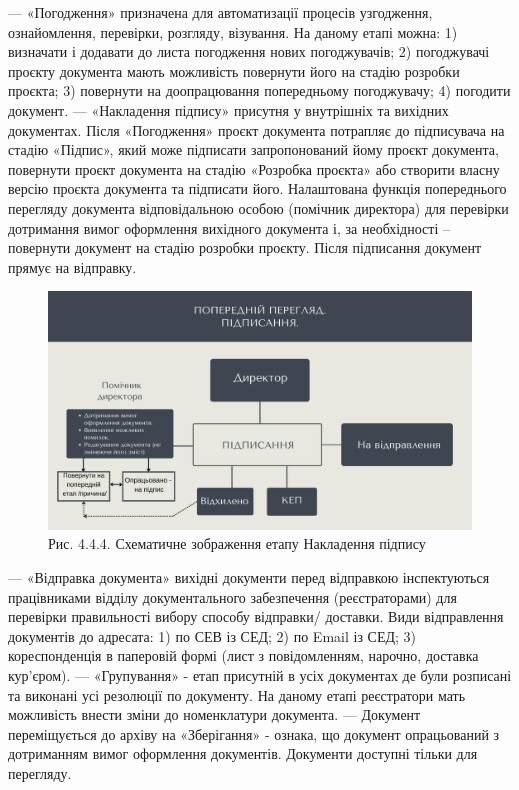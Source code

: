 --- «Погодження» призначена для автоматизації процесів узгодження,
ознайомлення, перевірки, розгляду, візування. На даному етапі можна:
1) визначати і додавати до листа погодження нових погоджувачів;
2) погоджувачі проєкту документа мають можливість повернути його
на стадію розробки проєкта;
3) повернути на доопрацювання попередньому погоджувачу;
4) погодити документ.
--- «Накладення підпису» присутня у внутрішніх та вихідних документах. Після
«Погодження» проєкт документа потрапляє до підписувача на стадію
«Підпис», який може підписати запропонований йому проєкт документа,
повернути проєкт документа на стадію «Розробка проєкта» або створити
власну версію проєкта документа та підписати його. Налаштована функція
попереднього перегляду документа відповідальною особою (помічник
директора) для перевірки дотримання вимог оформлення вихідного
документа і, за необхідності – повернути документ на стадію розробки
проєкту. Після підписання документ прямує на відправку.

\begin{figure}[!htbp]
\centerline{\includegraphics[width=\textwidth]{img/4.4.4.png}}
\caption{Рис. 4.4.4. Схематичне зображення етапу Накладення підпису}
\end{figure}

--- «Відправка документа» вихідні документи перед відправкою інспектуються
працівниками відділу документального забезпечення (реєстраторами) для
перевірки правильності вибору способу відправки/ доставки. Види
відправлення документів до адресата:
1) по СЕВ із СЕД;
2) по Email із СЕД;
3) кореспонденція в паперовій формі (лист з повідомленням, нарочно,
доставка кур’єром).
--- «Групування» - етап присутній в усіх документах де були розписані та
виконані усі резолюції по документу. На даному етапі реєстратори мать
можливість внести зміни до номенклатури документа.
--- Документ переміщується до архіву на «Зберігання» - ознака, що документ
опрацьований з дотриманням вимог оформлення документів. Документи
доступні тільки для перегляду.

